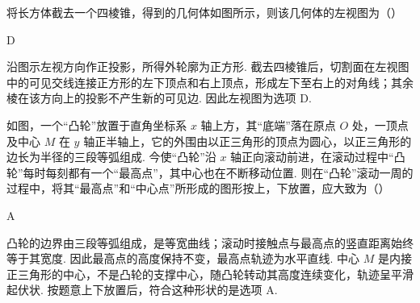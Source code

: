 \begin{problem}
将长方体截去一个四棱锥，得到的几何体如图所示，则该几何体的左视图为（\quad）


    {}
    {}
    {}
\end{problem}

\begin{answer}
D
\end{answer}

\begin{solution}
沿图示左视方向作正投影，所得外轮廓为正方形. 截去四棱锥后，切割面在左视图中的可见交线连接正方形的左下顶点和右上顶点，形成左下至右上的对角线；其余棱在该方向上的投影不产生新的可见边. 因此左视图为选项 D.
\end{solution}

\begin{problem}
如图，一个“凸轮”放置于直角坐标系 \(x\) 轴上方，其“底端”落在原点 \(O\) 处，一顶点及中心 \(M\) 在 \(y\) 轴正半轴上，它的外围由以正三角形的顶点为圆心，以正三角形的边长为半径的三段等弧组成. 今使“凸轮”沿 \(x\) 轴正向滚动前进，在滚动过程中“凸轮”每时每刻都有一个“最高点”，其中心也在不断移动位置. 则在“凸轮”滚动一周的过程中，将其“最高点”和“中心点”所形成的图形按上，下放置，应大致为（\quad）


    {}
    {}
    {}
\end{problem}

\begin{answer}
A
\end{answer}

\begin{solution}
凸轮的边界由三段等弧组成，是等宽曲线；滚动时接触点与最高点的竖直距离始终等于其宽度. 因此最高点的高度保持不变，最高点轨迹为水平直线. 中心 \(M\) 是内接正三角形的中心，不是凸轮的支撑中心，随凸轮转动其高度连续变化，轨迹呈平滑起伏状. 按题意上下放置后，符合这种形状的是选项 A.
\end{solution}

